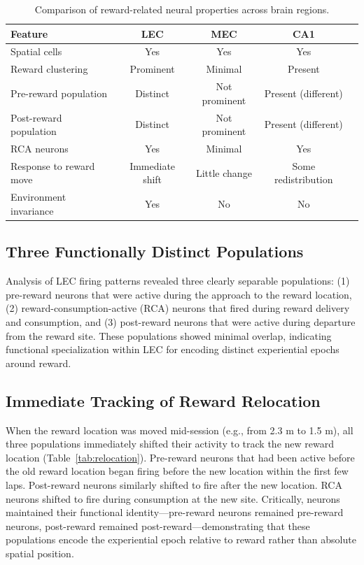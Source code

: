 \documentclass[12pt]{article}
\begin{document}
\begin{table}[ht]
\centering
\caption{Comparison of reward-related neural properties across brain regions.}
\label{tab:regions}
\begin{tabular}{lcccc}
\toprule
Feature & LEC & MEC & CA1 \\
\midrule
Spatial cells & Yes & Yes & Yes \\
Reward clustering & Prominent & Minimal & Present \\
Pre-reward population & Distinct & Not prominent & Present (different) \\
Post-reward population & Distinct & Not prominent & Present (different) \\
RCA neurons & Yes & Minimal & Yes \\
Response to reward move & Immediate shift & Little change & Some redistribution \\
Environment invariance & Yes & No & No \\
\bottomrule
\end{tabular}
\end{table}

\subsection{Three Functionally Distinct Populations}

Analysis of LEC firing patterns revealed three clearly separable populations: (1) pre-reward neurons that were active during the approach to the reward location, (2) reward-consumption-active (RCA) neurons that fired during reward delivery and consumption, and (3) post-reward neurons that were active during departure from the reward site. These populations showed minimal overlap, indicating functional specialization within LEC for encoding distinct experiential epochs around reward.

\subsection{Immediate Tracking of Reward Relocation}

When the reward location was moved mid-session (e.g., from 2.3 m to 1.5 m), all three populations immediately shifted their activity to track the new reward location (Table~\ref{tab:relocation}). Pre-reward neurons that had been active before the old reward location began firing before the new location within the first few laps. Post-reward neurons similarly shifted to fire after the new location. RCA neurons shifted to fire during consumption at the new site. Critically, neurons maintained their functional identity---pre-reward neurons remained pre-reward neurons, post-reward remained post-reward---demonstrating that these populations encode the experiential epoch relative to reward rather than absolute spatial position.
\end{document}
